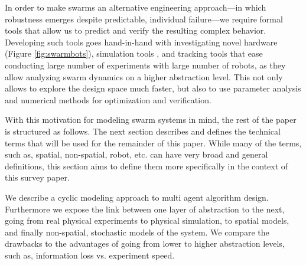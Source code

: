 \documentclass[Main.tex]{subfiles}
\begin{document}
In order to make swarms an alternative engineering approach---in which robustness emerges despite predictable, individual failure---we require formal tools that allow us to predict and verify the resulting complex behavior. Developing such tools goes hand-in-hand with investigating novel hardware (Figure \ref{fig:swarmbots}), simulation tools \cite{Michel1998}, and tracking 
tools \cite{correlliros06,lochmatter08} that ease conducting large number of experiments with large number of robots, as they allow analyzing swarm dynamics on a higher abstraction level. This not only allows to explore the design space much faster, but also to use parameter analysis and numerical methods for optimization and verification. 

With this motivation for modeling swarm systems in mind, the rest of the paper is structured as follows. The next section describes and defines the technical terms that will be used for the remainder of this paper. While many of the terms, such as, spatial, non-spatial, robot, etc. can have very broad and general definitions, this section aims to define them more specifically in the context of this survey paper. 

We describe a cyclic modeling approach to multi agent algorithm design. Furthermore we expose the link between one layer of abstraction to the next, going from real physical experiments to physical simulation, to spatial models, and finally non-spatial, stochastic models of the system. We compare the drawbacks to the advantages of going from lower to higher abstraction levels, such as, information loss vs. experiment speed. 

\end{document}
